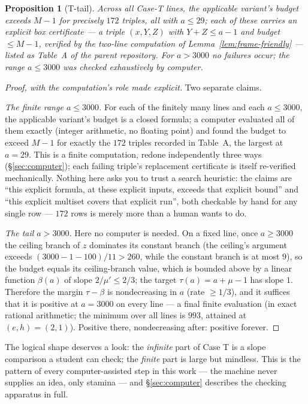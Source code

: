 \documentclass[11pt,reqno]{amsart}
\theoremstyle{plain}
\newtheorem{proposition}[theorem]{Proposition}
\theoremstyle{definition}
\theoremstyle{remark}
\begin{document}
\begin{proposition}[T-tail]\label{prop:ttail-friendly}
Across all Case-T lines, the applicable variant's budget exceeds $M - 1$ for
precisely $172$ triples, all with $a \le 29$; each of these carries an explicit
box certificate --- a triple $(x, Y, Z)$ with $Y + Z \le a - 1$ and budget $\le
M-1$, verified by the two-line computation of
Lemma~\ref{lem:frame-friendly} --- listed as \emph{Table~A} of the parent
repository. For $a > 3000$ no failures occur; the range $a \le 3000$ was checked
exhaustively by computer.
\end{proposition}

\begin{proof}[Proof, with the computation's role made explicit]
Two separate claims.

\emph{The finite range $a \le 3000$.} For each of the finitely many lines and
each $a \le 3000$, the applicable variant's budget is a closed formula; a
computer evaluated all of them exactly (integer arithmetic, no floating point)
and found the budget to exceed $M-1$ for exactly the $172$ triples recorded in
Table~A, the largest at $a = 29$. This is a finite computation, redone
independently three ways (\S\ref{sec:computer}); each failing triple's
replacement certificate is itself re-verified mechanically. Nothing here asks
you to trust a search heuristic: the claims are ``this explicit formula, at
these explicit inputs, exceeds that explicit bound'' and ``this explicit
multiset covers that explicit run'', both checkable by hand for any single row
--- $172$ rows is merely more than a human wants to do.

\emph{The tail $a > 3000$.} Here no computer is needed. On a fixed line, once $a
\ge 3000$ the ceiling branch of $z$ dominates its constant branch (the ceiling's
argument exceeds $(3000 - 1 - 100)/11 > 260$, while the constant branch is at
most $9$), so the budget equals its ceiling-branch value, which is bounded above
by a linear function $\beta(a)$ of slope $2/\mu' \le 2/3$; the target $\tau(a) =
a + \mu - 1$ has slope $1$. Therefore the margin $\tau - \beta$ is nondecreasing
in $a$ (rate $\ge 1/3$), and it suffices that it is positive at $a = 3000$ on
every line --- a final finite evaluation (in exact rational arithmetic; the
minimum over all lines is $993$, attained at $(e,h) = (2,1)$). Positive there,
nondecreasing after: positive forever.
\end{proof}

The logical shape deserves a look: the \emph{infinite} part of Case T is a
slope comparison a student can check; the \emph{finite} part is large but
mindless. This is the pattern of every computer-assisted step in this work ---
the machine never supplies an idea, only stamina --- and \S\ref{sec:computer}
describes the checking apparatus in full.
\end{document}
